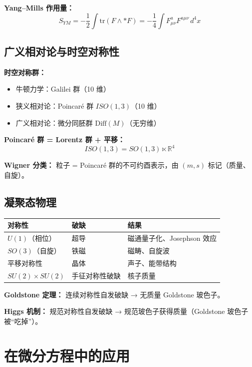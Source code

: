 \textbf{Yang--Mills 作用量：}
\[
S_{YM} = -\frac{1}{2}\int \text{tr}(F \wedge *F) = -\frac{1}{4}\int F_{\mu\nu}^a F^{a\mu\nu}\,d^4x
\]

\subsection{广义相对论与时空对称性}

\textbf{时空对称群：}
\begin{itemize}
  \item 牛顿力学：Galilei 群（10 维）
  \item 狭义相对论：Poincaré 群 $ISO(1,3)$（10 维）
  \item 广义相对论：微分同胚群 $\text{Diff}(M)$（无穷维）
\end{itemize}

\textbf{Poincaré 群 = Lorentz 群 + 平移：}
\[
ISO(1,3) = SO(1,3) \ltimes \mathbb{R}^4
\]

\textbf{Wigner 分类：} 粒子 = Poincaré 群的不可约酉表示，由 $(m, s)$ 标记（质量、自旋）。

\subsection{凝聚态物理}

\begin{center}
\begin{tabular}{p{4cm}p{4cm}p{4cm}}
\toprule
\textbf{对称性} & \textbf{破缺} & \textbf{结果} \\
\midrule
$U(1)$（相位） & 超导 & 磁通量子化、Josephson 效应 \\
$SO(3)$（自旋） & 铁磁 & 磁畴、自旋波 \\
平移对称性 & 晶体 & 声子、能带结构 \\
$SU(2) \times SU(2)$ & 手征对称性破缺 & 核子质量 \\
\bottomrule
\end{tabular}
\end{center}

\textbf{Goldstone 定理：} 连续对称性自发破缺 → 无质量 Goldstone 玻色子。

\textbf{Higgs 机制：} 规范对称性自发破缺 → 规范玻色子获得质量（Goldstone 玻色子被“吃掉”）。

\section{在微分方程中的应用}

